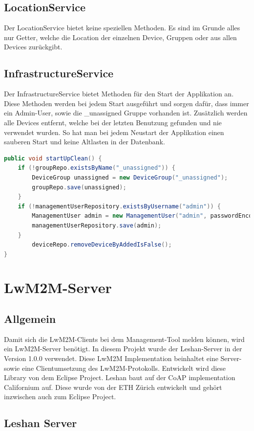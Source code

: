 \subsection{LocationService}
Der LocationService bietet keine speziellen Methoden. Es sind im Grunde alles nur Getter, welche die Location der einzelnen Device, Gruppen oder aus allen Devices zurückgibt.
\subsection{InfrastructureService}
Der InfrastructureService bietet Methoden für den Start der Applikation an. Diese Methoden werden bei jedem Start ausgeführt und sorgen dafür, dass immer ein Admin-User, sowie die \_unassigned Gruppe vorhanden ist. Zusätzlich werden alle Devices entfernt, welche bei der letzten Benutzung gefunden und nie verwendet wurden. So hat man bei jedem Neustart der Applikation einen sauberen Start und keine Altlasten in der Datenbank.
\begin{lstlisting}[language=java]
public void startUpClean() {
	if (!groupRepo.existsByName("_unassigned")) {
		DeviceGroup unassigned = new DeviceGroup("_unassigned");
		groupRepo.save(unassigned);
	}
	if (!managementUserRepository.existsByUsername("admin")) {
		ManagementUser admin = new ManagementUser("admin", passwordEncoder.encode("adminadmin"));
		managementUserRepository.save(admin);
	}
		deviceRepo.removeDeviceByAddedIsFalse();
}
\end{lstlisting}


\newpage

\section{LwM2M-Server}
\subsection{Allgemein}
Damit sich die LwM2M-Clients bei dem Management-Tool melden können, wird ein LwM2M-Server benötigt. In diesem Projekt wurde der Leshan-Server in der Version 1.0.0 verwendet. Diese LwM2M Implementation beinhaltet eine Server- sowie eine Clientumsetzung des LwM2M-Protokolls. Entwickelt wird diese Library von dem Eclipse Project. Leshan baut auf der CoAP implementation Californium auf. Diese wurde von der ETH Zürich entwickelt und  gehört inzwischen auch zum Eclipse Project.

\subsection{Leshan Server}
